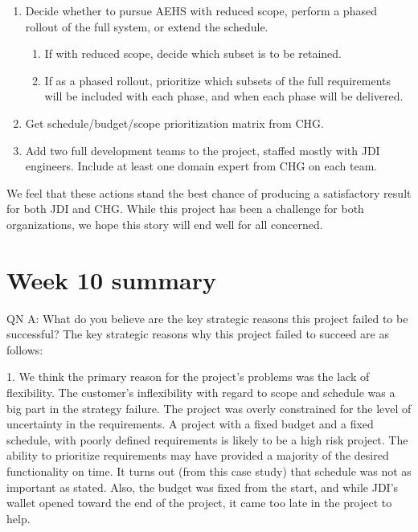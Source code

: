 \documentclass[12pt]{article}
\newif\iftodo
\begin{document}
\begin{enumerate}[\bf 1.]
\item Decide whether to pursue AEHS with reduced scope, perform a phased rollout of the full system,
  or extend the schedule.
  \begin{enumerate}[\bf a.]
  \item If with reduced scope, decide which subset is to be retained.
  \item If as a phased rollout, prioritize which subsets of the full requirements will be included
    with each phase, and when each phase will be delivered.
  \end{enumerate}
\item Get schedule/budget/scope prioritization matrix from CHG. 
\item Add two full development teams to the project, staffed mostly with JDI engineers.  Include at
  least one domain expert from CHG on each team.
\end{enumerate}

We feel that these actions stand the best chance of producing a satisfactory result for both JDI and
CHG.  While this project has been a challenge for both organizations, we hope this story will end
well for all concerned.



\iftodo
\section{Week 10 summary}

QN A: What do you believe are the key strategic reasons this project failed to be successful?  The
key strategic reasons why this project failed to succeed are as follows:

1.  We think the primary reason for the project’s problems was the lack of flexibility.  The
customer’s inflexibility with regard to scope and schedule was a big part in the strategy failure.
The project was overly constrained for the level of uncertainty in the requirements.  A project with
a fixed budget and a fixed schedule, with poorly defined requirements is likely to be a high risk
project.  The ability to prioritize requirements may have provided a majority of the desired
functionality on time.  It turns out (from this case study) that schedule was not as important as
stated.  Also, the budget was fixed from the start, and while JDI's wallet opened toward the end of
the project, it came too late in the project to help.
\end{document}
